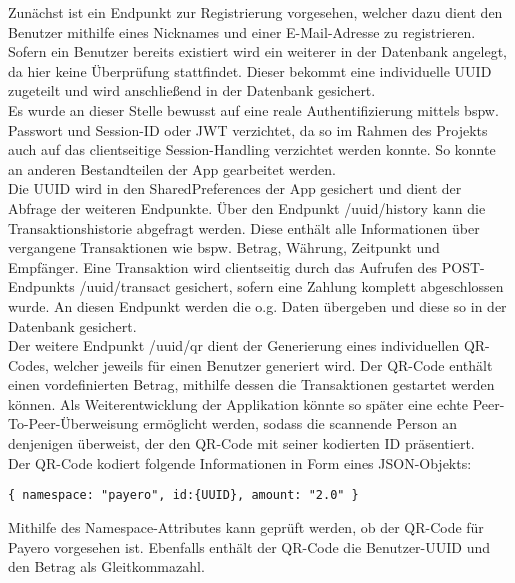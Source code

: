 Zunächst ist ein Endpunkt zur Registrierung vorgesehen, welcher dazu dient den Benutzer mithilfe eines Nicknames und einer E-Mail-Adresse zu registrieren.
Sofern ein Benutzer bereits existiert wird ein weiterer in der Datenbank angelegt, da hier keine Überprüfung stattfindet.
Dieser bekommt eine individuelle UUID zugeteilt und wird anschließend in der Datenbank gesichert.\\
Es wurde an dieser Stelle bewusst auf eine reale Authentifizierung mittels bspw. Passwort und Session-ID oder JWT verzichtet, da so im Rahmen des Projekts auch auf das clientseitige Session-Handling verzichtet werden konnte.
So konnte an anderen Bestandteilen der App gearbeitet werden.\\
Die UUID wird in den SharedPreferences der App gesichert und dient der Abfrage der weiteren Endpunkte.
Über den Endpunkt /{uuid}/history kann die Transaktionshistorie abgefragt werden.
Diese enthält alle Informationen über vergangene Transaktionen wie bspw. Betrag, Währung, Zeitpunkt und Empfänger.
Eine Transaktion wird clientseitig durch das Aufrufen des POST-Endpunkts /{uuid}/transact gesichert, sofern eine Zahlung komplett abgeschlossen wurde.
An diesen Endpunkt werden die o.g. Daten übergeben und diese so in der Datenbank gesichert.\\
Der weitere Endpunkt /{uuid}/qr dient der Generierung eines individuellen QR-Codes, welcher jeweils für einen Benutzer generiert wird. Der QR-Code enthält einen vordefinierten Betrag, mithilfe dessen die Transaktionen gestartet werden können.
Als Weiterentwicklung der Applikation könnte so später eine echte Peer-To-Peer-Überweisung ermöglicht werden, sodass die scannende Person an denjenigen überweist, der den QR-Code mit seiner kodierten ID präsentiert.\\
Der QR-Code kodiert folgende Informationen in Form eines JSON-Objekts:
\begin{lstlisting}[caption={Vom Backend generierte Notation für den QR-Code}]
  { namespace: "payero", id:{UUID}, amount: "2.0" }
\end{lstlisting}
Mithilfe des Namespace-Attributes kann geprüft werden, ob der QR-Code für Payero vorgesehen ist.
Ebenfalls enthält der QR-Code die Benutzer-UUID und den Betrag als Gleitkommazahl.